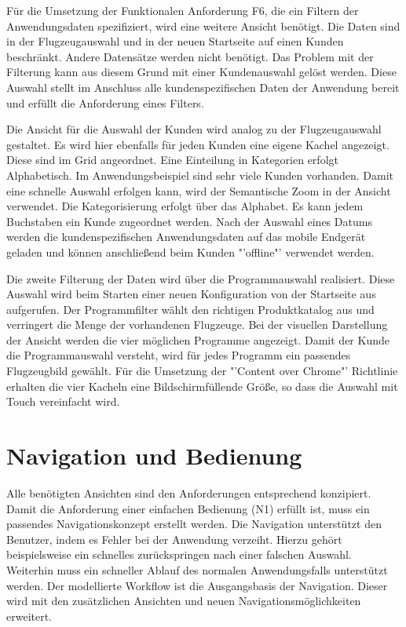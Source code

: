 Für die Umsetzung der Funktionalen Anforderung F6, die ein Filtern der Anwendungsdaten spezifiziert, wird eine weitere Ansicht benötigt. Die Daten sind in der Flugzeugauswahl und in der neuen Startseite auf einen Kunden beschränkt. Andere Datensätze werden nicht benötigt.  Das Problem mit der Filterung kann aus diesem Grund mit einer Kundenauswahl gelöst werden. Diese Auswahl stellt im Anschluss alle kundenspezifischen Daten der Anwendung bereit und erfüllt die Anforderung eines Filters. \par 

Die Ansicht für die Auswahl der Kunden wird analog zu der Flugzeugauswahl gestaltet. Es wird hier ebenfalls für jeden Kunden eine eigene Kachel angezeigt. Diese sind im Grid angeordnet. Eine Einteilung in Kategorien erfolgt Alphabetisch. Im Anwendungsbeispiel sind sehr viele Kunden vorhanden. Damit eine schnelle Auswahl erfolgen kann, wird der Semantische Zoom in der Ansicht verwendet. Die Kategorisierung erfolgt über das Alphabet. Es kann jedem Buchstaben ein Kunde zugeordnet werden. Nach der Auswahl eines Datums werden die kundenspezifischen Anwendungsdaten auf das mobile Endgerät geladen und können anschließend beim Kunden "'offline"' verwendet werden. \par 

Die zweite Filterung der Daten wird über die Programmauswahl realisiert. Diese Auswahl wird beim Starten einer neuen Konfiguration von der Startseite aus aufgerufen. Der Programmfilter wählt den richtigen Produktkatalog aus und verringert die Menge der vorhandenen Flugzeuge. Bei der visuellen Darstellung der Ansicht werden die vier möglichen Programme angezeigt. Damit der Kunde die Programmauswahl versteht, wird für jedes Programm ein passendes Flugzeugbild gewählt. Für die Umsetzung der "'Content over Chrome"' Richtlinie erhalten die vier Kacheln eine Bildschirmfüllende Größe, so dass die Auswahl mit Touch vereinfacht wird.


\section{Navigation und Bedienung}
Alle benötigten Ansichten sind den Anforderungen entsprechend konzipiert. Damit die Anforderung einer einfachen Bedienung (N1) erfüllt ist, muss ein passendes Navigationskonzept erstellt werden. Die Navigation unterstützt den Benutzer, indem es Fehler bei der Anwendung verzeiht. Hierzu gehört beispielsweise ein schnelles zurückspringen nach einer falschen Auswahl. Weiterhin muss ein schneller Ablauf des normalen Anwendungsfalls unterstützt werden. Der modellierte Workflow ist die Ausgangsbasis der Navigation. Dieser wird mit den zusätzlichen Ansichten und neuen Navigationsmöglichkeiten erweitert. \par 

